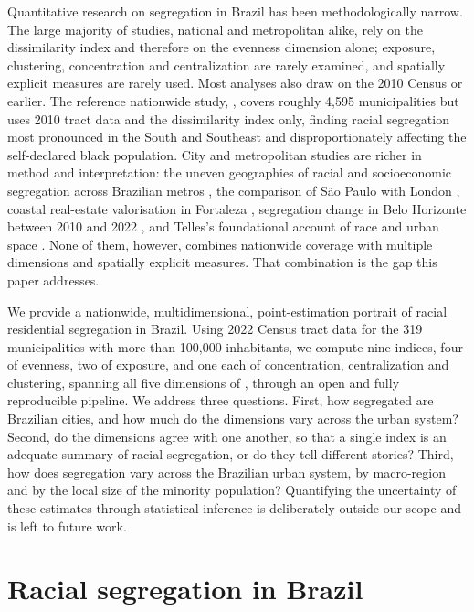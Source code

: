 \documentclass[12pt,a4paper]{article}
\begin{document}
Quantitative research on segregation in Brazil has been methodologically narrow. The large majority of studies, national and metropolitan alike, rely on the dissimilarity index and therefore on the evenness dimension alone; exposure, clustering, concentration and centralization are rarely examined, and spatially explicit measures are rarely used. Most analyses also draw on the 2010 Census or earlier. The reference nationwide study, \citet{deSouza2023nationwide_english}, covers roughly 4{,}595 municipalities but uses 2010 tract data and the dissimilarity index only, finding racial segregation most pronounced in the South and Southeast and disproportionately affecting the self-declared black population. City and metropolitan studies are richer in method and interpretation: the uneven geographies of racial and socioeconomic segregation across Brazilian metros \citep{barros2018unevengeographies}, the comparison of S\~ao Paulo with London \citep{barros2024saopaulolondres}, coastal real-estate valorisation in Fortaleza \citep{danilofranca2022fortaleza}, segregation change in Belo Horizonte between 2010 and 2022 \citep{strauch2026bh20102022}, and Telles's foundational account of race and urban space \citep{telles2004race}. None of them, however, combines nationwide coverage with multiple dimensions and spatially explicit measures. That combination is the gap this paper addresses.

We provide a nationwide, multidimensional, point-estimation portrait of racial residential segregation in Brazil. Using 2022 Census tract data for the 319 municipalities with more than 100{,}000 inhabitants, we compute nine indices, four of evenness, two of exposure, and one each of concentration, centralization and clustering, spanning all five dimensions of \citet{massey1988dimensions}, through an open and fully reproducible pipeline. We address three questions. First, how segregated are Brazilian cities, and how much do the dimensions vary across the urban system? Second, do the dimensions agree with one another, so that a single index is an adequate summary of racial segregation, or do they tell different stories? Third, how does segregation vary across the Brazilian urban system, by macro-region and by the local size of the minority population? Quantifying the uncertainty of these estimates through statistical inference is deliberately outside our scope and is left to future work.

\section{Racial segregation in Brazil}\label{sec:brazil}
\end{document}
